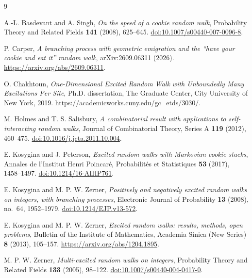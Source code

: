 \documentclass[11pt]{amsart}
\numberwithin{equation}{section}
\theoremstyle{remark}
\begin{document}
\begin{thebibliography}{9}

A.-L. Basdevant and A. Singh,
\emph{On the speed of a cookie random walk},
Probability Theory and Related Fields \textbf{141} (2008), 625--645.
\href{https://doi.org/10.1007/s00440-007-0096-8}{doi:10.1007/s00440-007-0096-8}.

P. Carper,
\emph{A branching process with geometric emigration and the ``have your cookie and eat it'' random walk},
arXiv:2609.06311 (2026).
\url{https://arxiv.org/abs/2609.06311}.

O. Chakhtoun,
\emph{One-Dimensional Excited Random Walk with Unboundedly Many Excitations Per Site},
Ph.D. dissertation, The Graduate Center, City University of New York, 2019.
\url{https://academicworks.cuny.edu/gc_etds/3030/}.

M. Holmes and T. S. Salisbury,
\emph{A combinatorial result with applications to self-interacting random walks},
Journal of Combinatorial Theory, Series A \textbf{119} (2012), 460--475.
\href{https://doi.org/10.1016/j.jcta.2011.10.004}{doi:10.1016/j.jcta.2011.10.004}.

E. Kosygina and J. Peterson,
\emph{Excited random walks with Markovian cookie stacks},
Annales de l'Institut Henri Poincar\'e, Probabilit\'es et Statistiques \textbf{53} (2017), 1458--1497.
\href{https://doi.org/10.1214/16-AIHP761}{doi:10.1214/16-AIHP761}.

E. Kosygina and M. P. W. Zerner,
\emph{Positively and negatively excited random walks on integers, with branching processes},
Electronic Journal of Probability \textbf{13} (2008), no.~64, 1952--1979.
\href{https://doi.org/10.1214/EJP.v13-572}{doi:10.1214/EJP.v13-572}.

E. Kosygina and M. P. W. Zerner,
\emph{Excited random walks: results, methods, open problems},
Bulletin of the Institute of Mathematics, Academia Sinica (New Series) \textbf{8} (2013), 105--157.
\url{https://arxiv.org/abs/1204.1895}.

M. P. W. Zerner,
\emph{Multi-excited random walks on integers},
Probability Theory and Related Fields \textbf{133} (2005), 98--122.
\href{https://doi.org/10.1007/s00440-004-0417-0}{doi:10.1007/s00440-004-0417-0}.

\end{thebibliography}
\end{document}
